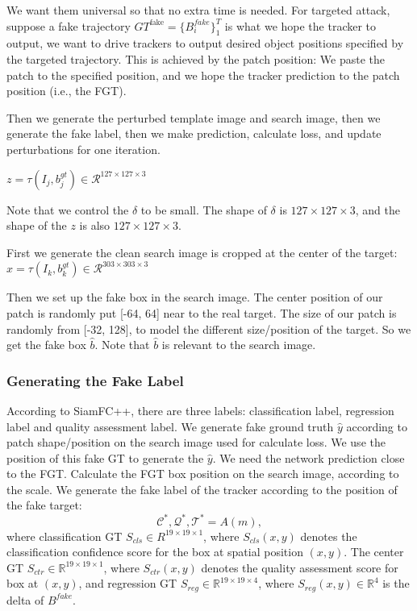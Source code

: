 \documentclass{article}
\begin{document}
We want them universal so that no extra time is needed.
For targeted attack, suppose a fake trajectory $GT^{\text{fake}}=\{B^{fake}_i\}_1^T$ is what we hope the tracker to output, we want to drive trackers to output desired object positions specified by the targeted trajectory. This is achieved by the patch position: We paste the patch to the specified position, and we hope the tracker prediction to the patch position (i.e., the FGT).

Then we generate the perturbed template image and search image, then we generate the fake label, then we make prediction, calculate loss, and update perturbations for one iteration.

$z = \tau (I_j, b^{gt}_j)\in \mathcal{R}^{127\times 127\times 3}$

Note that we control the $\delta$ to be small. The shape of $\delta$ is $127 \times 127 \times 3$, and the shape of the $z$ is also $127 \times 127 \times 3$.

First we generate the clean search image is cropped at the center of the target:$x = \tau(I_k, b_{k}^{gt})\in \mathcal{R}^{303\times 303 \times 3}$

Then we set up the fake box in the search image. The center position of our patch is randomly put [-64, 64] near to the real target. The size of our patch is randomly from [-32, 128], to model the different size/position of the target. So we get the fake box $\hat b$. Note that $\hat b$ is relevant to the search image.

\subsubsection{Generating the Fake Label}

According to SiamFC++, there are three labels: classification label, regression label and quality assessment label.
We generate fake ground truth $\hat y$ according to patch shape/position on the search image  used for calculate loss.
We use the position of this fake GT to generate the $\hat y$.
We need the network prediction close to the FGT.
Calculate the FGT box position on the search image, according to the scale.
We generate the fake label of the tracker according to the position of the fake target:
\begin{equation}
\mathcal{C^*, Q^*, T^*} = A(m),
\end{equation}
where classification GT $S_{cls} \in R^{19 \times 19 \times 1}$, where $S_{cls}(x,y)$ denotes the classification confidence score for the box at spatial position $(x,y)$. The center GT $S_{ctr} \in \mathbb{R}^{19 \times 19 \times 1}$, where $S_{ctr}(x,y)$ denotes the quality assessment score for box at $(x,y)$, and regression GT $S_{reg} \in \mathbb{R}^{19 \times 19 \times 4}$, where $S_{reg}(x,y) \in \mathbb R^{4}$ is the delta of $B^{fake}$.
\end{document}
